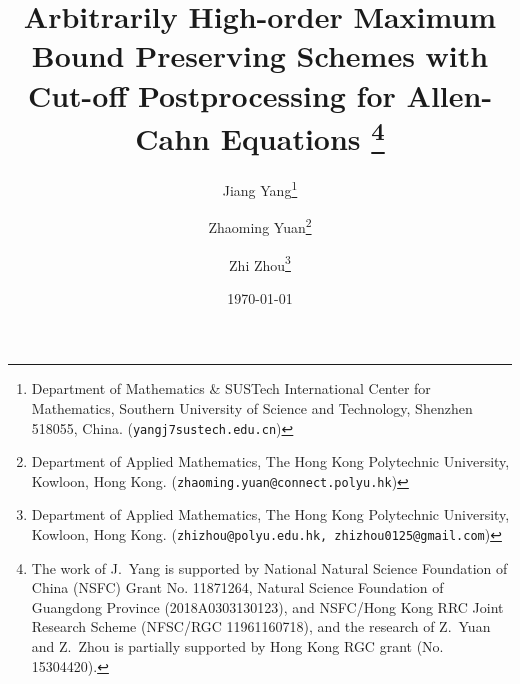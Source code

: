 \documentclass[10pt,final,leqno,onefignum,onetabnum]{siamltex}%
\begin{document}
\title{Arbitrarily High-order Maximum Bound Preserving Schemes with Cut-off Postprocessing for Allen-Cahn Equations
\thanks{The work of J.\ Yang is supported
 by National Natural Science Foundation of China (NSFC) Grant No. 11871264, Natural Science Foundation of Guangdong Province (2018A0303130123),
 and NSFC/Hong Kong RRC Joint Research Scheme (NFSC/RGC 11961160718), and
the research of Z.\ Yuan and Z.\ Zhou is partially supported by Hong Kong RGC grant (No. 15304420).}}



\author{Jiang Yang\thanks{Department of Mathematics \& SUSTech International Center for Mathematics, 
Southern University of Science and Technology, Shenzhen 518055, China.
(\texttt{yangj7sustech.edu.cn})}
\and Zhaoming Yuan\thanks{Department of Applied Mathematics, The Hong Kong Polytechnic University, Kowloon, Hong Kong.
(\texttt{zhaoming.yuan@connect.polyu.hk})}
\and Zhi Zhou\thanks{Department of Applied Mathematics, The Hong Kong Polytechnic University, Kowloon, Hong Kong.
(\texttt{zhizhou@polyu.edu.hk, zhizhou0125@gmail.com})}}
\date{\today}

 \maketitle
 
\end{document}
